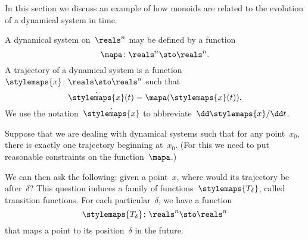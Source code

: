 In this section we discuss an example of how monoids are related to the evolution of a dynamical system in time.

\label{exa:transition-functions}
\begin{definition}
    \label{def:ct-dynsyst}
    A dynamical system on~$\reals^n$ may be defined by a function
    \begin{equation}
        \mapa \colon \reals^n \sto \reals^n.
    \end{equation}
    A trajectory of a dynamical system is a function~$\stylemaps{x}\colon \reals \sto \reals^n$ such that
    \begin{equation}
        \dot{\stylemaps{x}}(t) = \mapa(\stylemaps{x}(t)).
    \end{equation}
    We use the notation~$\dot{\stylemaps{x}}$ to abbreviate~$\dd \stylemaps{x} / \dd t$.
\end{definition}

Suppose that we are dealing with dynamical systems such that for any point~$x_0$, there is exactly one trajectory beginning at~$x_0$.
(For this we need to put reasonable constraints on the function~$\mapa$.)

We can then ask the following: given a point~$x$, where would its trajectory be after~$\delta$?
This question induces a family of functions~$\stylemaps{T_\delta}$, called transition functions.
For each particular~$\delta$, we have a function
\begin{equation}
    \stylemaps{T_{\delta}}\colon \reals^n \sto  \reals^n
\end{equation}
that maps a point to its position~$\delta$ in the future.

